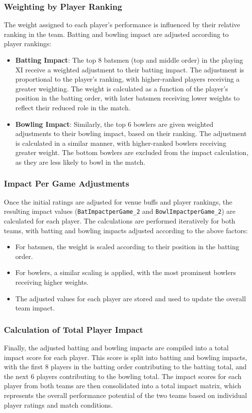 \documentclass{article}[12pt]
\begin{document}
\subsubsection{Weighting by Player Ranking}
The weight assigned to each player's performance is influenced by their relative ranking in the team. Batting and bowling impact are adjusted according to player rankings:
\begin{itemize}
    \item \textbf{Batting Impact}: The top 8 batsmen (top and middle order) in the playing XI receive a weighted adjustment to their batting impact. The adjustment is proportional to the player’s ranking, with higher-ranked players receiving a greater weighting. The weight is calculated as a function of the player's position in the batting order, with later batsmen receiving lower weights to reflect their reduced role in the match.
    \item \textbf{Bowling Impact}: Similarly, the top 6 bowlers are given weighted adjustments to their bowling impact, based on their ranking. The adjustment is calculated in a similar manner, with higher-ranked bowlers receiving greater weight. The bottom bowlers are excluded from the impact calculation, as they are less likely to bowl in the match.
\end{itemize}

\subsubsection{Impact Per Game Adjustments}
Once the initial ratings are adjusted for venue buffs and player rankings, the resulting impact values (\texttt{BatImpactperGame\_2} and \texttt{BowlImpactperGame\_2}) are calculated for each player. The calculations are performed iteratively for both teams, with batting and bowling impacts adjusted according to the above factors:
\begin{itemize}
    \item For batsmen, the weight is scaled according to their position in the batting order.
    \item For bowlers, a similar scaling is applied, with the most prominent bowlers receiving higher weights.
    \item The adjusted values for each player are stored and used to update the overall team impact.
\end{itemize}

\subsubsection{Calculation of Total Player Impact}
Finally, the adjusted batting and bowling impacts are compiled into a total impact score for each player. This score is split into batting and bowling impacts, with the first 8 players in the batting order contributing to the batting total, and the next 6 players contributing to the bowling total. The impact scores for each player from both teams are then consolidated into a total impact matrix, which represents the overall performance potential of the two teams based on individual player ratings and match conditions.
\end{document}
